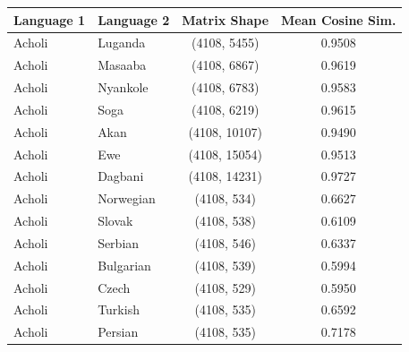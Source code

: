 \documentclass[11pt]{article}
\begin{document}
    \begin{table}
        [htbp]
        \centering
        \small
        \begin{tabular}{llcc}
            \toprule \textbf{Language 1} & \textbf{Language 2} & \textbf{Matrix Shape} & \textbf{Mean Cosine Sim.} \\
            \midrule Acholi              & Luganda             & (4108, 5455)          & 0.9508                    \\
            Acholi                       & Masaaba             & (4108, 6867)          & 0.9619                    \\
            Acholi                       & Nyankole            & (4108, 6783)          & 0.9583                    \\
            Acholi                       & Soga                & (4108, 6219)          & 0.9615                    \\
            Acholi                       & Akan                & (4108, 10107)         & 0.9490                    \\
            Acholi                       & Ewe                 & (4108, 15054)         & 0.9513                    \\
            Acholi                       & Dagbani             & (4108, 14231)         & 0.9727                    \\
            Acholi                       & Norwegian           & (4108, 534)           & 0.6627                    \\
            Acholi                       & Slovak              & (4108, 538)           & 0.6109                    \\
            Acholi                       & Serbian             & (4108, 546)           & 0.6337                    \\
            Acholi                       & Bulgarian           & (4108, 539)           & 0.5994                    \\
            Acholi                       & Czech               & (4108, 529)           & 0.5950                    \\
            Acholi                       & Turkish             & (4108, 535)           & 0.6592                    \\
            Acholi                       & Persian             & (4108, 535)           & 0.7178                    \\

\end{tabular}
\end{table}
\end{document}
